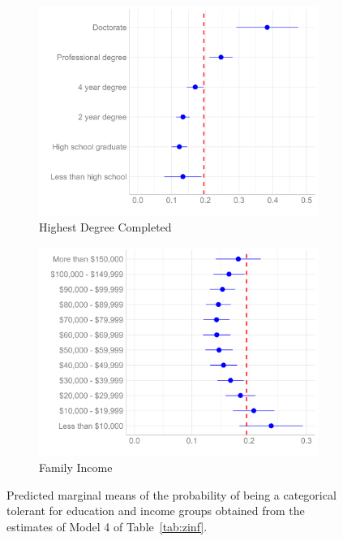 \documentclass[12pt]{article}
\begin{document}
\begin{figure}[ht!]
    \captionsetup[subfigure]{font=footnotesize,labelfont=footnotesize}
    \centering
     \begin{subfigure}[b]{0.49\textwidth}
        \includegraphics[width=1.0\textwidth]{Plots/educ-pred-plot.png}
            \caption{Highest Degree Completed}
            \label{fig:marg-educ}
    \end{subfigure}
     \begin{subfigure}[b]{0.49\textwidth}
        \includegraphics[width=1.0\textwidth]{Plots/inc-pred-plot.png}
            \caption{Family Income}
            \label{fig:marg-inc}
    \end{subfigure}
    \caption{Predicted marginal means of the probability of being a categorical tolerant for education and income groups obtained from the estimates of Model 4 of Table~\ref{tab:zinf}.}
    \label{fig:marg-effects}
\end{figure}
\end{document}
